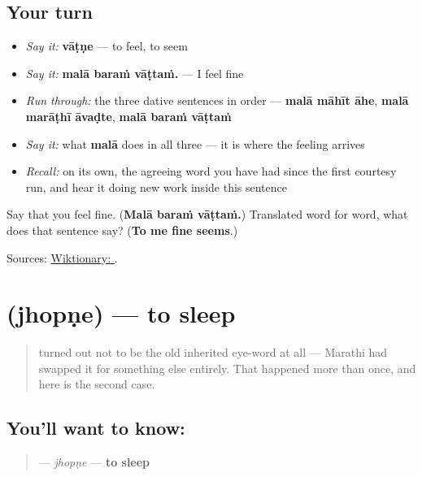 \subsection*{Your turn}
\begin{itemize}
\raggedright
  \item \emph{Say it:} \textbf{vāṭṇe} — to feel, to seem
  \item \emph{Say it:} \textbf{malā baraṁ vāṭtaṁ.} — I feel fine
  \item \emph{Run through:} the three dative sentences in order — \textbf{malā māhīt āhe}, \textbf{malā marāṭhī āvaḍte}, \textbf{malā baraṁ vāṭtaṁ}
  \item \emph{Say it:} what \textbf{malā} does in all three — it is where the feeling arrives
  \item \emph{Recall:} \textbf{} on its own, the agreeing word you have had since the first courtesy run, and hear it doing new work inside this sentence
\end{itemize}

\begin{tcolorbox}[breakable,colback=teal!4,colframe=teal!35!black,title={Before you move on}]
Say that you feel fine. (\textbf{Malā baraṁ vāṭtaṁ.}) Translated word for word, what does that sentence say? (\textbf{To me fine seems}.)

Sources: \href{https://en.wiktionary.org/wiki/\%E0\%A4\%B5\%E0\%A4\%BE\%E0\%A4\%9F\%E0\%A4\%A3\%E0\%A5\%87}{Wiktionary: }.
\end{tcolorbox}
\section[jhopṇe]{ (jhopṇe) — to sleep}

\label{lesson:MR-C23-jhopne}



\begin{quote}
\textbf{} turned out not to be the old inherited eye-word at all — Marathi had swapped it for something else entirely. That happened more than once, and here is the second case.
\end{quote}

\subsection*{You'll want to know: }
\begin{quote}
\textbf{} — \emph{jhopṇe} — \textbf{to sleep}
\end{quote}

